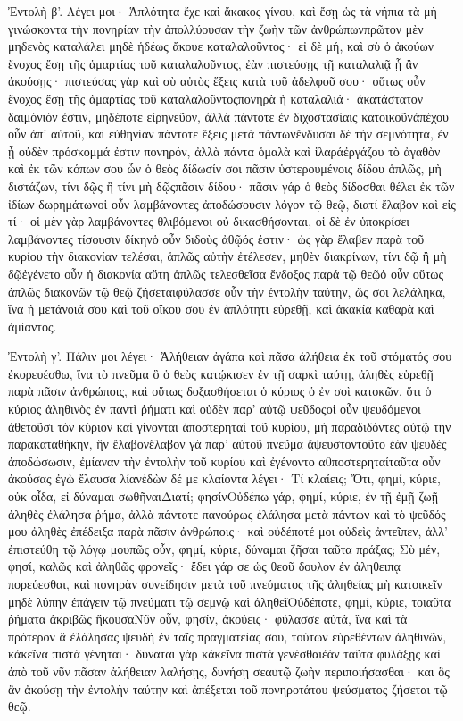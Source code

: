 Ἐντολὴ β’.
Λέγει μοι· Ἁπλότητα ἔχε καὶ ἄκακος γίνου, καὶ ἔσῃ ὡς τὰ νήπια τὰ μὴ γινώσκοντα τὴν πονηρίαν τὴν ἀπολλύουσαν τὴν ζωὴν τῶν ἀνθρώπωνπρῶτον μὲν μηδενὸς καταλάλει μηδὲ ἡδέως ἄκουε καταλαλοῦντος· εἰ δὲ μή, καὶ σὺ ὁ ἀκούων ἔνοχος ἔσῃ τῆς ἁμαρτίας τοῦ καταλαλοῦντος, ἐὰν πιστεύσῃς τῇ καταλαλιᾷ ᾗ ἂν ἀκούσῃς· πιστεύσας γὰρ καὶ σὺ αὐτὸς ἕξεις κατὰ τοῦ ἀδελφοῦ σου· οὕτως οὖν ἔνοχος ἔσῃ τῆς ἁμαρτίας τοῦ καταλαλοῦντοςπονηρὰ ἡ καταλαλιά· ἀκατάστατον δαιμόνιόν ἐστιν, μηδέποτε εἰρηνεῦον, ἀλλὰ πάντοτε ἐν διχοστασίαις κατοικοῦνἀπέχου οὖν ἀπ’ αὐτοῦ, καὶ εὐθηνίαν πάντοτε ἕξεις μετὰ πάντωνἔνδυσαι δὲ τὴν σεμνότητα, ἐν ᾗ οὐδὲν πρόσκομμά ἐστιν πονηρόν, ἀλλὰ πάντα ὁμαλὰ καὶ ἱλαράἐργάζου τὸ ἀγαθὸν καὶ ἐκ τῶν κόπων σου ὧν ὁ θεὸς δίδωσίν σοι πᾶσιν ὑστερουμένοις δίδου ἁπλῶς, μὴ διστάζων, τίνι δῷς ἢ τίνι μὴ δῷςπᾶσιν δίδου· πᾶσιν γάρ ὁ θεὸς δίδοσθαι θέλει ἐκ τῶν ἰδίων δωρημάτωνοἱ οὖν λαμβάνοντες ἀποδώσουσιν λόγον τῷ θεῷ, διατί ἔλαβον καὶ εἰς τί· οἱ μὲν γὰρ λαμβάνοντες θλιβόμενοι οὐ δικασθήσονται, οἱ δὲ ἐν ὑποκρίσει λαμβάνοντες τίσουσιν δίκηνὁ οὖν διδοὺς ἀθῷός ἐστιν· ὡς γὰρ ἔλαβεν παρὰ τοῦ κυρίου τὴν διακονίαν τελέσαι, ἁπλῶς αὐτὴν ἐτέλεσεν, μηθὲν διακρίνων, τίνι δῷ ἢ μὴ δῷἐγένετο οὖν ἡ διακονία αὕτη ἁπλῶς τελεσθεῖσα ἔνδοξος παρά τῷ θεῷὁ οὖν οὕτως ἁπλῶς διακονῶν τῷ θεῷ ζήσεταιφύλασσε οὖν τὴν ἐντολὴν ταύτην, ὥς σοι λελάληκα, ἵνα ἡ μετάνοιά σου καὶ τοῦ οἴκου σου ἐν ἁπλότητι εὑρεθῇ, καὶ ἀκακία καθαρὰ καὶ ἀμίαντος.

Ἐντολὴ γ’.
Πάλιν μοι λέγει· Ἀλήθειαν ἀγάπα καὶ πᾶσα ἀλήθεια ἐκ τοῦ στόματός σου ἐκορευέσθω, ἵνα τὸ πνεῦμα ὃ ὁ θεὸς κατῴκισεν ἐν τῇ σαρκὶ ταύτῃ, ἀληθὲς εὑρεθῇ παρὰ πᾶσιν ἀνθρώποις, καὶ οὕτως δοξασθήσεται ὁ κύριος ὁ ἐν σοὶ κατοκῶν, ὅτι ὁ κύριος ἀληθινὸς ἐν παντὶ ῥήματι καὶ οὐδὲν παρ’ αὐτῷ ψεῦδοςοἱ οὖν ψευδόμενοι ἀθετοῦσι τὸν κύριον καὶ γίνονται ἀποστερηταὶ τοῦ κυρίου, μὴ παραδιδόντες αὐτῷ τὴν παρακαταθήκην, ἣν ἔλαβονἔλαβον γὰ παρ’ αὐτοῦ πνεῦμα ἄψευστοντοῦτο ἐὰν ψευδὲς ἀποδώσωσιν, ἐμίαναν τὴν ἐντολὴν τοῦ κυρίου καὶ ἐγένοντο α0ποστερηταίταῦτα οὖν ἀκούσας ἐγὼ ἔλαυσα λίανἐδὼν δέ με κλαίοντα λέγει· Τί κλαίεις; Ὅτι, φημί, κύριε, οὐκ οἶδα, εἰ δύναμαι σωθῆναιΔιατί; φησίνΟὐδέπω γάρ, φημί, κύριε, ἐν τῇ ἐμῇ ζωῇ ἀληθὲς ἐλάλησα ῥήμα, ἀλλὰ πάντοτε πανούρως ἐλάλησα μετὰ πάντων καὶ τὸ ψεῦδός μου ἀληθὲς ἐπέδειξα παρὰ πᾶσιν ἀνθρώποις· καὶ οὐδέποτέ μοι οὐδεὶς ἀντεῖπεν, ἀλλ’ ἐπιστεύθη τῷ λόγῳ μουπῶς οὖν, φημί, κύριε, δύναμαι ζῆσαι ταῦτα πράξας; Σὺ μέν, φησί, καλῶς καὶ ἀληθῶς φρονεῖς· ἔδει γάρ σε ὡς θεοῦ δουλον ἐν ἀληθειπᾳ πορεύεσθαι, καὶ πονηρὰν συνείδησιν μετὰ τοῦ πνεύματος τῆς ἀληθείας μὴ κατοικεῖν μηδὲ λύπην ἐπάγειν τῷ πνεύματι τῷ σεμνῷ καὶ ἀληθεῖΟὐδέποτε, φημί, κύριε, τοιαῦτα ῥήματα ἀκριβῶς ἤκουσαΝῦν οὖν, φησίν, ἀκούεις· φύλασσε αὐτά, ἵνα καὶ τὰ πρότερον ἃ ἐλάλησας ψευδὴ ἐν ταῖς πραγματείας σου, τούτων εὑρεθέντων ἀληθινῶν, κἀκεῖνα πιστὰ γένηται· δύναται γὰρ κἀκεῖνα πιστὰ γενέσθαιἐὰν ταῦτα φυλάξῃς καὶ ἀπὸ τοῦ νῦν πᾶσαν ἀλήθειαν λαλήσῃς, δυνήσῃ σεαυτῷ ζωὴν περιποιήσασθαι· και ὃς ἂν ἀκούσῃ τὴν ἐντολὴν ταύτην καὶ ἀπέξεται τοῦ πονηροτάτου ψεύσματος ζήσεται τῷ θεῷ.


